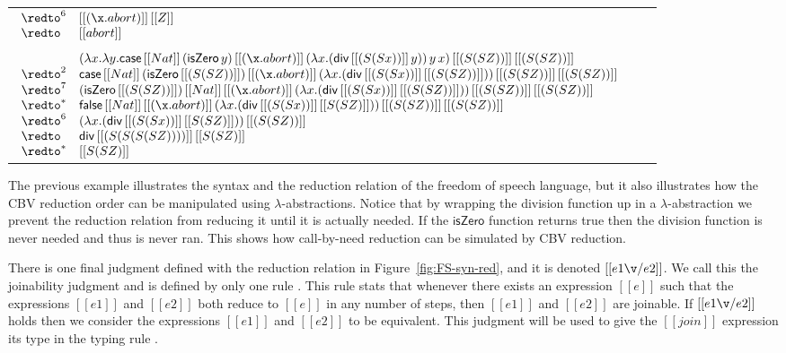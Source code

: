 \begin{example}
\begin{center}
\begin{tabular}{lll}
\begin{math}
\begin{array}{lll}
        \redto^6 & [[(\x.abort)]]\,[[Z]]\\
        \redto   & [[abort]]\\
      \end{array}
    \end{math}\\
    \\
    \begin{math}
      \begin{array}{lll}
                 & (\lambda x.\lambda y.\mathsf{case}\,[[Nat]]\,(\mathsf{isZero}\,y)\,[[(\x.abort)]]\,(\lambda x.(\mathsf{div}\,[[(S (S x))]]\,y))\,y\,x)\,[[(S (S Z))]]\,[[(S (S Z))]] \\
        \redto^2 & \mathsf{case}\,[[Nat]]\,(\mathsf{isZero}\,[[(S (S Z))]])\,[[(\x.abort)]]\,(\lambda x.(\mathsf{div}\,[[(S (S x))]]\,[[(S (S Z))]]))\,[[(S (S Z))]]\,[[(S (S Z))]] \\
        \redto^7 & (\mathsf{isZero}\,[[(S (S Z))]])\,[[Nat]]\,[[(\x.abort)]]\,(\lambda x.(\mathsf{div}\,[[(S (S x))]]\,[[(S (S Z))]]))\,[[(S (S Z))]]\,[[(S (S Z))]] \\
        \redto^* & \mathsf{false}\,[[Nat]]\,[[(\x.abort)]]\,(\lambda x.(\mathsf{div}\,[[(S (S x))]]\,[[S (S Z)]]))\,[[(S (S Z))]]\,[[(S (S Z))]] \\
        \redto^6 & (\lambda x.(\mathsf{div}\,[[(S (S x))]]\,[[S (S Z)]]))\,[[(S (S Z))]]\\
        \redto   & \mathsf{div}\,[[(S (S (S (S Z))))]]\,[[S (S Z)]]\\
        \redto^* & [[S (S Z)]]\\
      \end{array}
    \end{math}
    \end{tabular}
  \end{center}
\end{example}

The previous example illustrates the syntax and the reduction relation
of the freedom of speech language, but it also illustrates how the CBV
reduction order can be manipulated using $\lambda$-abstractions.
Notice that by wrapping the division function up in a
$\lambda$-abstraction we prevent the reduction relation from reducing
it until it is actually needed.  If the $\mathsf{isZero}$ function
returns true then the division function is never needed and thus is
never ran.  This shows how call-by-need reduction can be simulated by
CBV reduction.  

There is one final judgment defined with the reduction relation in
Figure~\ref{fig:FS-syn-red}, and it is denoted $[[e1 \v/ e2]]$. We
call this the joinability judgment and is defined by only one rule
. This rule stats that whenever there exists
an expression $[[e]]$ such that the expressions $[[e1]]$ and $[[e2]]$
both reduce to $[[e]]$ in any number of steps, then $[[e1]]$ and
$[[e2]]$ are joinable.  If $[[e1 \v/ e2]]$ holds then we consider the
expressions $[[e1]]$ and $[[e2]]$ to be equivalent.  This judgment
will be used to give the $[[join]]$ expression its type in the typing
rule .

